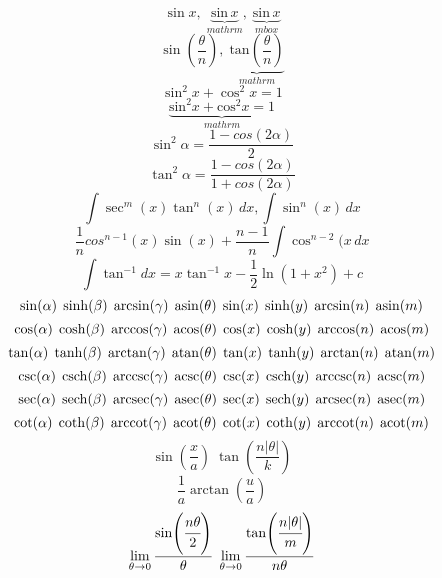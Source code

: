 \documentclass[12pt]{article}
\begin{document}
\setlength{\parindent}{0pt}

\[ \sin x ,\; \underbrace{\mathrm{sin}\,x}_{mathrm},\; \underbrace{\mbox{sin}\, x}_{mbox} \]
\[ \sin\!\left(\frac{\theta}{n}\right),\; \underbrace{\mathrm{tan}\!\left(\frac{\theta}{n}\right)}_{mathrm} \]
\[ \sin^2\!x + \cos^2 \!x = 1 \]
\[ \underbrace{\mathrm{sin}^2 x + \mathrm{cos}^2 x = 1 }_{mathrm} \]
\vspace{1em}
\[ \sin^2\alpha = \frac{1-cos(2\alpha)}{2} \]
\[ \tan^2\alpha = \frac{1-cos(2\alpha)}{1+cos(2\alpha)} \]
\[ \int \sec^m(x) \tan^n(x)\,dx, \int \sin^n(x)\,dx \]
\[ \frac{1}{n}cos^{n-1}(x)\sin(x) + \frac{n-1}{n}\int \cos^{n-2}(x\,dx \]
\[ \int\tan^{-1}dx=x\tan^{-1}x-\frac{1}{2}\ln\left(1+x^2\right) +c \]  
\vspace{1em}
\[ \sin(\alpha)\; \sinh(\beta)\;\arcsin(\gamma)\;\asin(\theta)\;\sine(x)\;\hypsine(y)\;\arcsine(n)\;\asine(m)\]
\[ \cos(\alpha)\;\cosh(\beta)\;\arccos(\gamma)\;\acos(\theta)\;\cosine(x)\;\hypcosine(y)\;\arccosine(n)\;\acosine(m) \]
\[ \tan(\alpha)\;\tanh(\beta)\;\arctan(\gamma)\;\atan(\theta)\;\tangent(x)\;\hyptangent(y)\;\arctangent(n)\;\atangent(m) \]
\[ \csc(\alpha)\;\csch(\beta)\;\arccsc(\gamma)\;\acsc(\theta)\;\cosecant(x)\;\hypcosecant(y)\;\arccosecant(n)\;\acosecant(m) \]
\[ \sec(\alpha)\;\sech(\beta)\;\arcsec(\gamma)\;\asec(\theta)\;\secant(x)\;\hypsecant(y)\;\arcsecant(n)\;\asecant(m) \]
\[ \cot(\alpha)\;\coth(\beta)\;\arccot(\gamma)\;\acot(\theta)\;\cotangent(x)\;\hypcotangent(y)\;\arccotangent(n)\;\acotangent(m) \]
\vspace{1em}
\[ \sin(\frac{x}{a})\;\tan(\frac{n|\theta|}{k})\]
\[ \frac{1}{a}\arctan(\frac{u}{a})\]
\[ \lim_{\theta \to 0}\frac{\sin(\cfrac{n\theta}{2})}{\theta}\;\lim_{\theta \to 0}\frac{\tan(\cfrac{n|\theta|}{m})}{n\theta}\]
\end{document}
